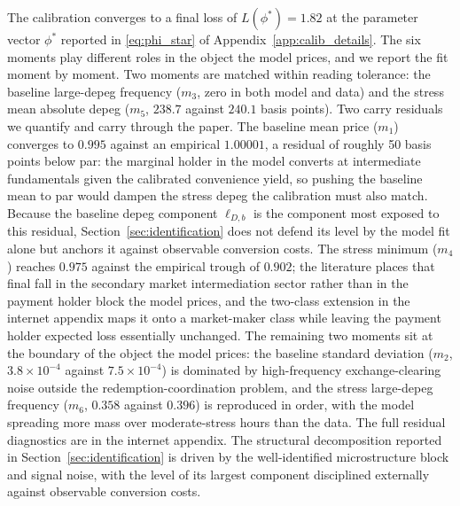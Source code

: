 The calibration converges to a final loss of $L(\phi^*) = 1.82$ at the parameter vector $\phi^*$ reported in \eqref{eq:phi_star} of Appendix~\ref{app:calib_details}. The six moments play different roles in the object the model prices, and we report the fit moment by moment. Two moments are matched within reading tolerance: the baseline large-depeg frequency ($m_3$, zero in both model and data) and the stress mean absolute depeg ($m_5$, $238.7$ against $240.1$ basis points). Two carry residuals we quantify and carry through the paper. The baseline mean price ($m_1$) converges to $0.995$ against an empirical $1.00001$, a residual of roughly 50 basis points below par: the marginal holder in the model converts at intermediate fundamentals given the calibrated convenience yield, so pushing the baseline mean to par would dampen the stress depeg the calibration must also match. Because the baseline depeg component $\ell_{D,b}$ is the component most exposed to this residual, Section~\ref{sec:identification} does not defend its level by the model fit alone but anchors it against observable conversion costs. The stress minimum ($m_4$) reaches $0.975$ against the empirical trough of $0.902$; the literature places that final fall in the secondary market intermediation sector rather than in the payment holder block the model prices, and the two-class extension in the internet appendix maps it onto a market-maker class while leaving the payment holder expected loss essentially unchanged. The remaining two moments sit at the boundary of the object the model prices: the baseline standard deviation ($m_2$, $3.8 \times 10^{-4}$ against $7.5 \times 10^{-4}$) is dominated by high-frequency exchange-clearing noise outside the redemption-coordination problem, and the stress large-depeg frequency ($m_6$, $0.358$ against $0.396$) is reproduced in order, with the model spreading more mass over moderate-stress hours than the data. The full residual diagnostics are in the internet appendix. The structural decomposition reported in Section~\ref{sec:identification} is driven by the well-identified microstructure block and signal noise, with the level of its largest component disciplined externally against observable conversion costs.
